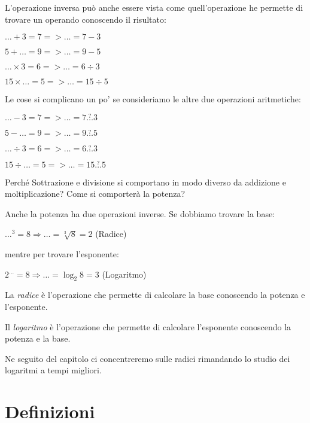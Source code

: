 L'operazione inversa può anche essere vista come quell'operazione he permette
di trovare un operando conoscendo il risultato:

$\dots + 3 = 7 => \dots = 7 - 3$

$5 + \dots = 9 => \dots = 9 - 5$

$\dots \times 3 = 6 => \dots = 6 \div 3$

$15 \times \dots = 5 => \dots = 15 \div 5$

Le cose si complicano un po' se consideriamo le altre due operazioni
aritmetiche:

$\dots - 3 = 7 => \dots = 7 \overset{?}{\dots} 3$

$5 - \dots = 9 => \dots = 9 \overset{?}{\dots} 5$

$\dots \div 3 = 6 => \dots = 6 \overset{?}{\dots} 3$

$15 \div \dots = 5 => \dots = 15 \overset{?}{\dots} 5$

Perché Sottrazione e divisione si comportano in modo diverso da addizione e
moltiplicazione? Come si comporterà la potenza?

Anche la potenza ha due operazioni inverse. Se dobbiamo trovare la base:

$\dots ^3 = 8 \Rightarrow \dots = \sqrt[3]{8} = 2$ (Radice)

mentre per trovare l'esponente:

$2 ^{\dots} = 8 \Rightarrow \dots = \log_{2}{8} = 3$ (Logaritmo)

\begin{definizione}
La \emph{radice} è l'operazione che permette di calcolare la base conoscendo
la potenza e l'esponente.
\end{definizione}

\begin{definizione}
Il \emph{logaritmo} è l'operazione che permette di calcolare l'esponente
conoscendo la potenza e la base.
\end{definizione}

Ne seguito del capitolo ci concentreremo sulle radici rimandando lo studio
dei logaritmi a tempi migliori.

\section{Definizioni}
\label{sec:radicali_definizioni}

